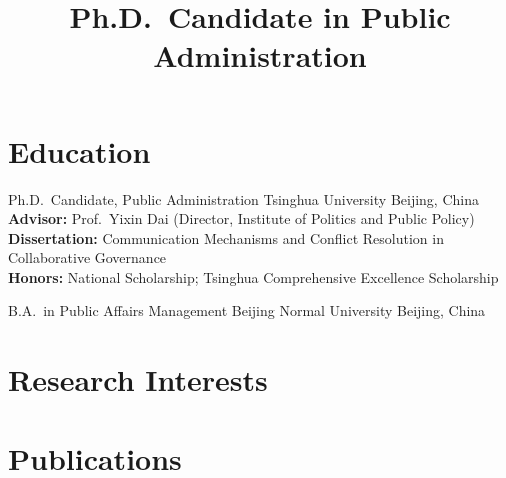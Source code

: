 \documentclass[11pt, a4paper]{moderncv}
\title{Ph.D.\ Candidate in Public Administration}
\begin{document}
\makecvtitle

\section{Education}

  {Ph.D.\ Candidate, Public Administration}
  {Tsinghua University}
  {Beijing, China}
  {}
  {
    \textbf{Advisor:} Prof.\ Yixin Dai (Director, Institute of Politics and Public Policy)\\
    \textbf{Dissertation:} Communication Mechanisms and Conflict Resolution in Collaborative Governance\\
    \textbf{Honors:} National Scholarship; Tsinghua Comprehensive Excellence Scholarship
  }

  {B.A.\ in Public Affairs Management}
  {Beijing Normal University}
  {Beijing, China}
  {}
  {}

\section{Research Interests}


\section{Publications}
\end{document}
